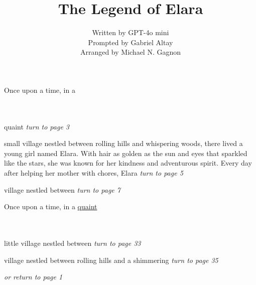 \documentclass{memoir}
\author{Written by GPT-4o mini\\Prompted by Gabriel Altay\\Arranged by Michael N. Gagnon}
\title{\HUGE The Legend of Elara}
\begin{document}
            \maketitle
            \thispagestyle{empty} 
            \mainmatter
            

        \hspace{1cm}\vfill
        \begin{minipage}{3in}
        \LARGE
        Once upon a time, in a \\ \vspace{5mm} \\
  \\ 

        \hspace{1cm}\begin{minipage}{6cm}
        \normalsize
            quaint  \hfill \textit{turn to page 3}\\ \vspace{5mm}

small village nestled between rolling hills and whispering woods, there lived a young girl named Elara. With hair as golden as the sun and eyes that sparkled like the stars, she was known for her kindness and adventurous spirit. Every day after helping her mother with chores, Elara \hfill \textit{turn to page 5}\\ \vspace{5mm}

village nestled between  \hfill \textit{turn to page 7}\\ \vspace{5mm}


        \end{minipage} 
        \end{minipage}
        \hspace{1cm}\vfill
        \cleardoublepage

        


        \hspace{1cm}\vfill
        \begin{minipage}{3in}
        \LARGE
        Once upon a time, in a \ul{quaint}\\ \vspace{5mm} \\
  \\ 

        \hspace{1cm}\begin{minipage}{6cm}
        \normalsize
            little village nestled between  \hfill \textit{turn to page 33}\\ \vspace{5mm}

village nestled between rolling hills and a shimmering  \hfill \textit{turn to page 35}\\ \vspace{5mm}

\hfill \textit{or return to page 1}
        \end{minipage} 
        \end{minipage}
        \hspace{1cm}\vfill
        \cleardoublepage
\end{document}
